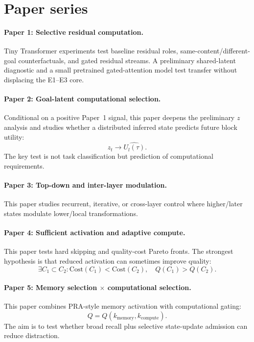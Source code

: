 \documentclass[10pt]{article}
\begin{document}
\section{Paper series}
\paragraph{Paper 1: Selective residual computation.}
Tiny Transformer experiments test baseline residual roles, same-content/different-goal counterfactuals, and gated residual streams. A preliminary shared-latent diagnostic and a small pretrained gated-attention model test transfer without displacing the E1--E3 core.

\paragraph{Paper 2: Goal-latent computational selection.}
Conditional on a positive Paper~1 signal, this paper deepens the preliminary $z$ analysis and studies whether a distributed inferred state predicts future block utility:
\[
z_t\rightarrow \widehat{U_l(\tau)}.
\]
The key test is not task classification but prediction of computational requirements.

\paragraph{Paper 3: Top-down and inter-layer modulation.}
This paper studies recurrent, iterative, or cross-layer control where higher/later states modulate lower/local transformations.

\paragraph{Paper 4: Sufficient activation and adaptive compute.}
This paper tests hard skipping and quality-cost Pareto fronts. The strongest hypothesis is that reduced activation can sometimes improve quality:
\[
\exists C_1\subset C_2:
\mathrm{Cost}(C_1)<\mathrm{Cost}(C_2),
\quad Q(C_1)>Q(C_2).
\]

\paragraph{Paper 5: Memory selection $\times$ computational selection.}
This paper combines PRA-style memory activation with computational gating:
\[
Q=Q(k_{\mathrm{memory}},k_{\mathrm{compute}}).
\]
The aim is to test whether broad recall plus selective state-update admission can reduce distraction.
\end{document}
